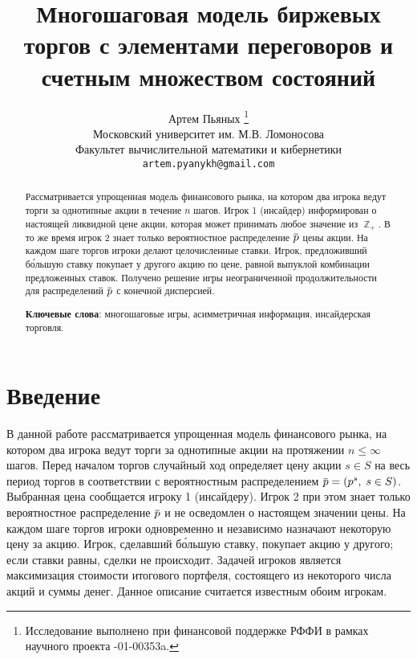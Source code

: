 \documentclass[12pt, draft]{extarticle}
\newcommand{\overbar}[1]%
{\mkern 1.5mu\overline{\mkern-1.3mu#1\mkern-1.3mu}\mkern 1.3mu}
\newcommand{\s}{\ensuremath{s}}
\newcommand{\p}{\ensuremath{\overbar{p}}}
\DeclareMathOperator{\Z}{\mathbb{Z}}
\begin{document}
\title{Многошаговая модель биржевых торгов с элементами переговоров и счетным
  множеством состояний%
}%
\author{%
  Артем Пьяных%
  \thanks{%
    Исследование выполнено при финансовой поддержке РФФИ в рамках научного
    проекта -01-00353a.%
  }\\
  Московский университет им. М.В. Ломоносова\\
  Факультет вычислительной математики и кибернетики\\
  \texttt{artem.pyanykh@gmail.com}%
}%
\maketitle

\begin{abstract}
  Рассматривается упрощенная модель финансового рынка, на котором два игрока
  ведут торги за однотипные акции в течение $n$ шагов. Игрок 1 (инсайдер)
  информирован о настоящей ликвидной цене акции, которая может принимать любое
  значение из $\Z_+$. В то же время игрок 2 знает только вероятностное
  распределение $\p$ цены акции. На каждом шаге торгов игроки делают
  целочисленные ставки. Игрок, предложивший б\'{о}льшую ставку покупает у
  другого акцию по цене, равной выпуклой комбинации предложенных ставок.
  Получено решение игры неограниченной продолжительности для распределений $\p$
  с конечной дисперсией.

  \textbf{Ключевые слова}: многошаговые игры, асимметричная информация,
  инсайдерская торговля.
\end{abstract}

\section{Введение}
\label{sec:intro}

В данной работе рассматривается упрощенная модель финансового рынка, на котором
два игрока ведут торги за однотипные акции на протяжении $n \leqslant \infty$
шагов. Перед началом торгов случайный ход определяет цену акции $\s \in S$ на
весь период торгов в соответствии с вероятностным распределением $\p = (p^s, \;
s \in S)$. Выбранная цена сообщается игроку 1 (инсайдеру). Игрок 2 при этом
знает только вероятностное распределение $\p$ и не осведомлен о настоящем
значении цены. На каждом шаге торгов игроки одновременно и независимо назначают
некоторую цену за акцию. Игрок, сделавший б\'{о}льшую ставку, покупает акцию у
другого; если ставки равны, сделки не происходит. Задачей игроков является
максимизация стоимости итогового портфеля, состоящего из некоторого числа акций
и суммы денег. Данное описание считается известным обоим игрокам.
\end{document}

